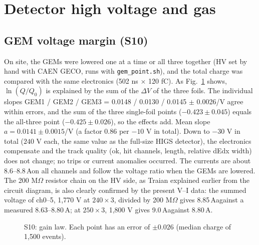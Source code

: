 \documentclass[a4paper,11pt]{article}
\newcommand{\uA}{\,\textmu A}
\begin{document}
\section{Detector high voltage and gas}

\subsection{GEM voltage margin (S10)}
On site, the GEMs were lowered one at a time or all three together (HV set by hand with CAEN GECO, runs with \texttt{gem\_point.sh}), and the total charge was compared with the same electronics (502 ns $\times$ 120 fC).
As Fig.~\ref{fig:gain} shows, $\ln(Q/Q_0)$ is explained by the sum of the $\Delta V$ of the three foils. The individual slopes GEM1 / GEM2 / GEM3 = 0.0148 / 0.0130 / 0.0145 $\pm$ 0.0026/V agree within errors,
and the sum of the three single-foil points ($-0.423 \pm 0.045$) equals the all-three point ($-0.425 \pm 0.026$), so the effects add. Mean slope $a = 0.0141 \pm 0.0015$/V (a factor 0.86 per $-10$ V in total).
Down to $-30$ V in total ($240$ V each, the same value as the full-size HIGS detector), the electronics compensate and the track quality (ok, hit channels, length, relative dEdx width) does not change; no trips or current anomalies occurred.
The currents are about 8.6--8.8\uA on all channels and follow the voltage ratio when the GEMs are lowered. The 200 M$\Omega$ resistor chain on the HV side, as Traian explained earlier from the circuit diagram, is also clearly confirmed by the present V--I data: the summed voltage of ch0--5, 1,770 V at $240 \times 3$, divided by 200 M$\Omega$ gives 8.85\uA against a measured 8.63--8.80\uA; at $250 \times 3$, 1,800 V gives 9.0\uA against 8.80\uA.

\begin{figure}[H]\centering
{}
\caption{S10: gain law. Each point has an error of $\pm 0.026$ (median charge of 1,500 events).}
\label{fig:gain}
\end{figure}
\end{document}
